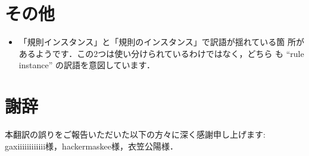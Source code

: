\documentclass[12pt,titlepage,twoside,openright,dvipdfmx]{jsbook}
\theoremstyle{definition}
\begin{document}
\section*{その他}

\begin{itemize}
\item 「規則インスタンス」と「規則のインスタンス」で訳語が揺れている箇
  所があるようです．この2つは使い分けられているわけではなく，どちら
  も ``rule instance'' の訳語を意図しています．
\end{itemize}

\section*{謝辞}

本翻訳の誤りをご報告いただいた以下の方々に深く感謝申し上げます: gaxiiiiiiiiiiii様，hackermaskee様，衣笠公陽様．
\end{document}

